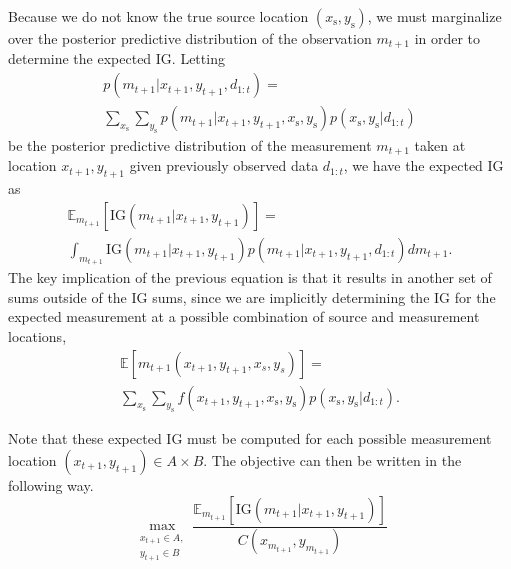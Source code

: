 \documentclass[letterpaper]{article} %
\begin{document}
Because we do not know the true source location $(x_{\text{s}}, y_{\text{s}})$, we must marginalize over the posterior predictive distribution of the observation $m_{t+1}$ in order to determine the expected IG. Letting 
\begin{multline*}
p(m_{t+1}|x_{t+1}, y_{t+1}, d_{1:t}) =  \\ \sum_{x_{\text{s}}} \sum_{y_{\text{s}}}  p(m_{t+1}| x_{t+1}, y_{t+1}, x_{\text{s}}, y_{\text{s}})p(x_{\text{s}},y_{\text{s}} | d_{1:t})
\end{multline*}
be the posterior predictive distribution of the measurement $m_{t+1}$ taken at location $x_{t+1}, y_{t+1}$ given previously observed data $d_{1:t}$, we have the expected IG as 
\begin{multline*}
  \mathbb{E}_{m_{t+1}}\left[\mathrm{IG}(m_{t+1}| x_{t+1}, y_{t+1})\right]=\\
  \int_{m_{t+1}}\mathrm{IG}(m_{t+1}| x_{t+1}, y_{t+1}) 
  p(m_{t+1}|x_{t+1}, y_{t+1}, d_{1:t}) 
  dm_{t+1}.
\end{multline*}
The key implication of the previous equation is that it results in another set of sums outside of the IG sums, since we are implicitly determining the IG for the expected measurement at a possible combination of source and measurement locations,
\begin{multline*}
  \mathbb{E}\left[m_{t+1}(x_{t+1}, y_{t+1}, x_s, y_s)\right] = \\
  \sum_{x_{\text{s}}} \sum_{y_{\text{s}}}  f(x_{t+1}, y_{t+1}, x_{\text{s}}, y_{\text{s}})p(x_{\text{s}},y_{\text{s}} | d_{1:t}).
\end{multline*}

Note that these expected IG must be computed for each possible measurement location $(x_{t+1},y_{t+1}) \in A \times B$. The objective can then be written in the following way. 
%
\begin{equation}
  \label{equ:ig_cost}
  \max_{\substack{x_{t+1} \in A, \\ y_{t+1} \in B}}  \frac{\mathbb{E}_{m_{t+1}}\left[\mathrm{IG}\left( m_{t+1} |  x_{t+1}, y_{t+1} \right)\right]}{C( x_{m_{t+1}},  y_{m_{t+1}})}
\end{equation}
\end{document}
